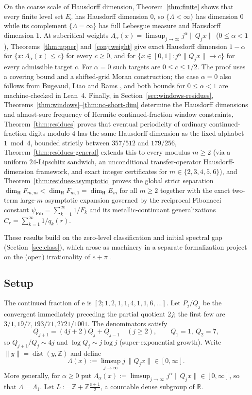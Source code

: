 \documentclass[11pt]{article}
\theoremstyle{definition}
\theoremstyle{remark}
\newcommand{\R}{\mathbb{R}}
\newcommand{\Z}{\mathbb{Z}}
\newcommand{\ee}{\mathrm{e}}
\newcommand{\dist}{\operatorname{dist}}
\newcommand{\dimH}{\dim_{\mathrm{H}}}
\newcommand{\Lam}{\Lambda}
\begin{document}
On the coarse scale of Hausdorff dimension, Theorem~\ref{thm:finite} shows that
every finite level set $E_c$ has Hausdorff dimension $0$, so $\{\Lam<\infty\}$
has dimension $0$ while its complement $\{\Lam=\infty\}$ has full Lebesgue
measure and Hausdorff dimension $1$. At subcritical weights
$\Lam_\alpha(x)=\limsup_{j\to\infty}j^\alpha\|Q_jx\|$ ($0\le\alpha<1$),
Theorems~\ref{thm:upper} and~\ref{conj:weight} give exact Hausdorff dimension $1-\alpha$ for
$\{x:\Lam_\alpha(x)\le c\}$ for every $c\ge0$, and for
$\{x\in[0,1]:j^\alpha\|Q_jx\|\to c\}$ for every admissible target $c$.
For $\alpha=0$ such targets are $0\le c\le 1/2$.
The proof uses a covering bound and a shifted-grid Moran construction;
the case $\alpha=0$ also follows from Bugeaud, Liao and Rams \cite{BLR}, and
both bounds for $0\le\alpha<1$ are machine-checked in Lean~4. Finally, in
Section~\ref{sec:windows-residues}, Theorems~\ref{thm:windows}--\ref{thm:no-short-dim}
determine the Hausdorff dimensions and almost-sure frequency of Hermite
continued-fraction window constraints, Theorem~\ref{thm:residues} proves
that eventual periodicity of ordinary continued-fraction digits modulo $4$ has
the same Hausdorff dimension as the fixed alphabet $1\bmod 4$, bounded strictly
between $357/512$ and $179/256$, Theorem~\ref{thm:residues-general} extends this
to every modulus $m\ge2$ (via a uniform $24$-Lipschitz sandwich, an unconditional
transfer-operator Hausdorff-dimension framework, and exact integer certificates
for $m\in\{2,3,4,5,6\}$), and Theorem~\ref{thm:residues-asymptotic} proves the
global strict separation $\dimH F_{m,m}<\dimH F_{m,1}=\dimH E_m$ for all $m\ge2$
together with the exact two-term large-$m$ asymptotic expansion governed by the
reciprocal Fibonacci constant $\psi_{\mathrm{Fib}}=\sum_{k=1}^\infty 1/F_k$ and
its metallic-continuant generalizations $C_r=\sum_{k=1}^\infty 1/q_k(r)$.

These results build on the zero-level classification and initial spectral gap
(Section~\ref{sec:class}), which arose as machinery in a separate formalization
project on the (open) irrationality of $e+\pi$ \cite{Phase1}.

\subsection{Setup}

The continued fraction of $\ee$ is $[2;1,2,1,1,4,1,1,6,\dots]$. Let $P_j/Q_j$
be the convergent immediately preceding the partial quotient $2j$; the first
few are $3/1,19/7,193/71,2721/1001$. The denominators satisfy
\begin{equation}\label{eq:rec}
Q_{j+1}=(4j+2)Q_j+Q_{j-1}\quad(j\ge2),\qquad Q_1=1,\ Q_2=7,
\end{equation}
so $Q_{j+1}/Q_j\sim 4j$ and $\log Q_j\sim j\log j$ (super-exponential growth).
Write $\|y\|=\dist(y,\Z)$ and define
\[
\Lam(x):=\limsup_{j\to\infty} j\,\|Q_j x\|\in[0,\infty].
\]
More generally, for $\alpha\ge0$ put
$\Lam_\alpha(x):=\limsup_{j\to\infty} j^\alpha\|Q_j x\|\in[0,\infty]$,
so that $\Lam=\Lam_1$.
Let $L:=\Z+\Z\frac{\ee+1}{2}$, a countable dense subgroup of $\R$.
\end{document}
